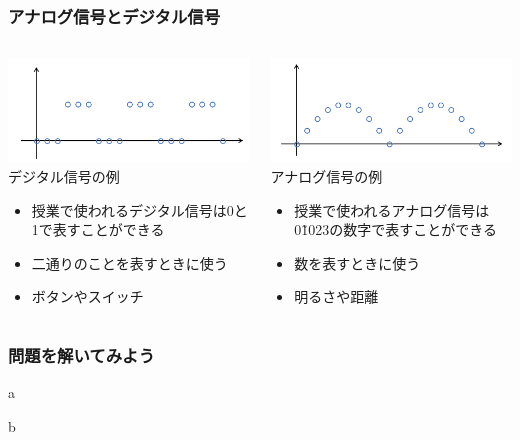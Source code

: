 \begin{frame}[fragile]
    \frametitle{アナログ信号とデジタル信号}
    \begin{columns}
        \begin{column}{0.48\textwidth}
            \includegraphics[width=\textwidth]{images/chap05/text05-img002.png} 
            {デジタル信号の例}
            \vspace{2pt}
            \begin{itemize}
                \item 授業で使われるデジタル信号は0と1で表すことができる
                \item 二通りのことを表すときに使う
                \item ボタンやスイッチ
            \end{itemize}
        \end{column}
        \begin{column}{0.48\textwidth}
            \includegraphics[width=\textwidth]{images/chap05/text05-img003.png} 
            {アナログ信号の例}
            \vspace{2pt}
            \begin{itemize}
                \item 授業で使われるアナログ信号は0\~1023の数字で表すことができる
                \item 数を表すときに使う
                \item 明るさや距離
            \end{itemize}
        \end{column}
    \end{columns}
\end{frame}

\begin{frame}[fragile]
    \frametitle{問題を解いてみよう}
    \begin{description}
        \item a
        \item b
    \end{description}
\end{frame}
